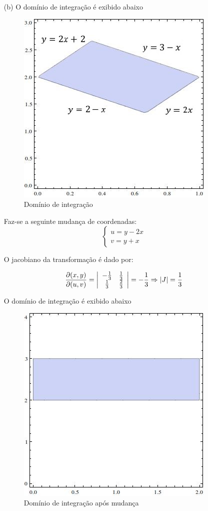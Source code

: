 \documentclass[12pt,a4paper]{article}
\begin{document}
\begin{itemize}
    \item[(b)] O domínio de integração é exibido abaixo

\begin{figure}[h!]
	\centering
	\includegraphics[scale=0.5]{Q1bB.jpg}  
	\caption{Domínio de integração}
	\label{fig:figura8}
\end{figure}
    
Faz-se a seguinte mudança de coordenadas:
    $$\left\{
	\begin{array}{lr}
	u = y-2x\\
	v = y+x
	\end{array}
	\right. 
	$$
    
O jacobiano da transformação é dado por:

$$
\frac{\partial(x,y)}{\partial(u,v)}=
\left|
\begin{array}{cc}
-\frac{1}{3} & \frac{1}{3} \\
\frac{1}{3} & \frac{2}{3}\\
\end{array}
\right|
=-\frac{1}{3} \Rightarrow |J|=\frac{1}{3}\\
$$    

O domínio de integração é exibido abaixo

\begin{figure}[h!]
	\centering
	\includegraphics[scale=0.5]{Q1b2B.jpg}  
	\caption{Domínio de integração após mudança}
	\label{fig:figura9}
\end{figure}


\end{itemize}
\end{document}
